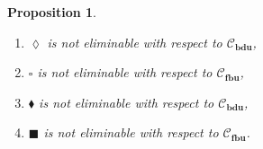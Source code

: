 \documentclass[draft]{article}
\newtheorem{proposition}{Proposition}
\def\bucfra{\mathbf{bu}}
\def\fbucfra{\mathbf{fbu}}
\def\bducfra{\mathbf{bdu}}
\begin{document}
%
%
%
%
\begin{proposition}\label{interdefinable:3}
%
%
\begin{enumerate}
%
%
\item $\lozenge$ is not eliminable with respect to ${\mathcal C}_{\bducfra}$,
%
%
\item $\square$ is not eliminable with respect to ${\mathcal C}_{\fbucfra}$,
%
%
\item $\blacklozenge$ is not eliminable with respect to ${\mathcal C}_{\bducfra}$,
%
%
\item $\blacksquare$ is not eliminable with respect to ${\mathcal C}_{\fbucfra}$.
%
%
\end{enumerate}
%
%
\end{proposition}
%
%
\end{document}
